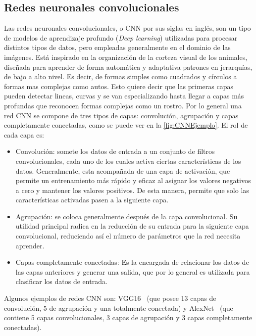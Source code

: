 \subsection{Redes neuronales convolucionales} \label{sec:redesneuronalesconvolucionales}
Las redes neuronales convolucionales, o CNN por sus siglas en inglés, son un tipo de modelos de aprendizaje profundo (\textit{Deep learning}) utilizadas  para procesar distintos tipos de datos, pero empleadas generalmente en el dominio de las imágenes. Está inspirado en la organización de la corteza visual de los animales, diseñada para aprender de forma automática y adaptativa patrones en jerarquías, de bajo a alto nivel. Es decir, de formas simples como cuadrados y círculos a formas mas complejas como autos. Esto quiere decir que las primeras capas pueden detectar lineas, curvas y se van especializando hasta llegar a capas más profundas que reconocen formas complejas como un rostro. Por lo general una red CNN se compone de tres tipos de capas: convolución, agrupación y capas completamente conectadas, como se puede ver en la \autoref{fig:CNNEjemplo}. El rol de cada capa es:

\begin{itemize}
	\item Convolución: somete los datos de entrada a un conjunto de filtros convolucionales, cada uno de los cuales activa ciertas características de los datos. Generalmente, esta acompañada de una capa de activación, que permite un entrenamiento más rápido y eficaz al asignar los valores negativos a cero y mantener los valores positivos. De esta manera, permite que solo las características activadas pasen a la siguiente capa.
	\item Agrupación: se coloca generalmente después de la capa convolucional. Su utilidad principal radica en la reducción de su entrada para la siguiente capa convolucional, reduciendo así el número de parámetros que la red necesita aprender.
	\item Capas completamente conectadas: Es la encargada de relacionar los datos de las capas anteriores y generar una salida, que por lo general es utilizada para clasificar los datos de entrada.
\end{itemize}


Algunos ejemplos de redes CNN son: VGG16~\cite{simonyan2014very} (que posee 13 capas de convolución, 5 de agrupación y una totalmente conectada) y AlexNet~\cite{krizhevsky2012imagenet} (que contiene 5 capas convolucionales, 3 capas de agrupación y 3 capas completamente conectadas).\\


